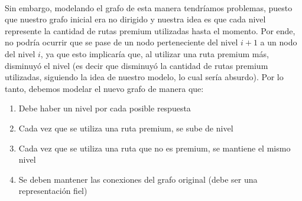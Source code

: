 \\
\par
Sin embargo, modelando el grafo de esta manera tendríamos problemas, puesto que nuestro grafo inicial era no dirigido y nuestra idea es que cada nivel represente la cantidad de rutas premium utilizadas hasta el momento. Por ende, no podría ocurrir que se pase de un nodo perteneciente del nivel $i+1$ a un nodo del nivel $i$, ya que esto implicaría que, al utilizar una ruta premium más, disminuyó el nivel (es decir que disminuyó la cantidad de rutas premium utilizadas, siguiendo la idea de nuestro modelo, lo cual sería absurdo). Por lo tanto, debemos modelar el nuevo grafo de manera que:
\begin{enumerate}
\item Debe haber un nivel por cada posible respuesta
\item Cada vez que se utiliza una ruta premium, se sube de nivel
\item Cada vez que se utiliza una ruta que no es premium, se mantiene el mismo nivel
\item Se deben mantener las conexiones del grafo original (debe ser una representación fiel)
\end{enumerate}

